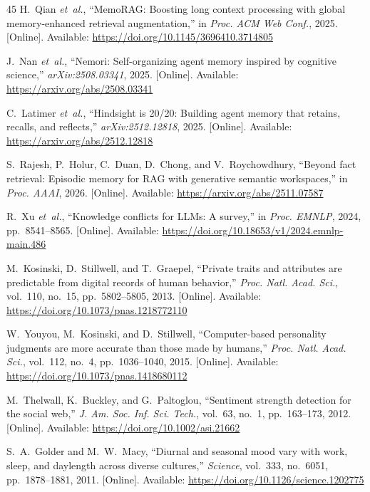 \documentclass[conference]{IEEEtran}
\begin{document}
\begin{thebibliography}{45}
H.~Qian \emph{et~al.}, ``MemoRAG: Boosting long context processing with global memory-enhanced retrieval augmentation,'' in \emph{Proc. ACM Web Conf.}, 2025. [Online]. Available: \url{https://doi.org/10.1145/3696410.3714805}

J.~Nan \emph{et~al.}, ``Nemori: Self-organizing agent memory inspired by cognitive science,'' \emph{arXiv:2508.03341}, 2025. [Online]. Available: \url{https://arxiv.org/abs/2508.03341}

C.~Latimer \emph{et~al.}, ``Hindsight is 20/20: Building agent memory that retains, recalls, and reflects,'' \emph{arXiv:2512.12818}, 2025. [Online]. Available: \url{https://arxiv.org/abs/2512.12818}

S.~Rajesh, P.~Holur, C.~Duan, D.~Chong, and V.~Roychowdhury, ``Beyond fact retrieval: Episodic memory for RAG with generative semantic workspaces,'' in \emph{Proc. AAAI}, 2026. [Online]. Available: \url{https://arxiv.org/abs/2511.07587}

R.~Xu \emph{et~al.}, ``Knowledge conflicts for LLMs: A survey,'' in \emph{Proc. EMNLP}, 2024, pp.~8541--8565. [Online]. Available: \url{https://doi.org/10.18653/v1/2024.emnlp-main.486}

M.~Kosinski, D.~Stillwell, and T.~Graepel, ``Private traits and attributes are predictable from digital records of human behavior,'' \emph{Proc. Natl. Acad. Sci.}, vol.~110, no.~15, pp.~5802--5805, 2013. [Online]. Available: \url{https://doi.org/10.1073/pnas.1218772110}

W.~Youyou, M.~Kosinski, and D.~Stillwell, ``Computer-based personality judgments are more accurate than those made by humans,'' \emph{Proc. Natl. Acad. Sci.}, vol.~112, no.~4, pp.~1036--1040, 2015. [Online]. Available: \url{https://doi.org/10.1073/pnas.1418680112}

M.~Thelwall, K.~Buckley, and G.~Paltoglou, ``Sentiment strength detection for the social web,'' \emph{J. Am. Soc. Inf. Sci. Tech.}, vol.~63, no.~1, pp.~163--173, 2012. [Online]. Available: \url{https://doi.org/10.1002/asi.21662}

S.~A.~Golder and M.~W.~Macy, ``Diurnal and seasonal mood vary with work, sleep, and daylength across diverse cultures,'' \emph{Science}, vol.~333, no.~6051, pp.~1878--1881, 2011. [Online]. Available: \url{https://doi.org/10.1126/science.1202775}


\end{thebibliography}
\end{document}
